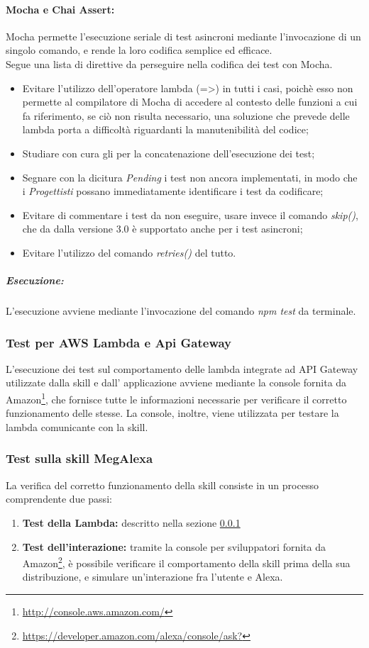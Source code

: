 \paragraph{Mocha e Chai Assert:} Mocha permette l'esecuzione seriale di test asincroni mediante l'invocazione di un singolo comando, e rende la loro codifica semplice ed efficace.\\
Segue una lista di direttive da perseguire nella codifica dei test con Mocha.
\begin{itemize}
	\item Evitare l'utilizzo dell'operatore lambda (=>) in tutti i casi, poichè esso non permette al compilatore di Mocha di accedere al contesto delle funzioni a cui fa riferimento, se ciò non risulta necessario, una soluzione che prevede delle lambda porta a difficoltà riguardanti la manutenibilità del codice;
	\item Studiare con cura gli  per la concatenazione dell'esecuzione dei test;
	\item Segnare con la dicitura \textit{Pending} i test non ancora implementati, in modo che i \textit{Progettisti} possano immediatamente identificare i test da codificare;
	\item Evitare di commentare i test da non eseguire, usare invece il comando \textit{skip()}, che da dalla versione 3.0 è supportato anche per i test asincroni;
	\item Evitare l'utilizzo del comando \textit{retries()} del tutto.
\end{itemize}

\subparagraph{Esecuzione:} L'esecuzione avviene mediante l'invocazione del comando \textit{npm test} da terminale. 

\subsubsection{Test per AWS Lambda e Api Gateway}\label{labmdatest}
L'esecuzione dei test sul comportamento delle lambda integrate ad API Gateway utilizzate dalla skill e dall' applicazione avviene mediante la console fornita da Amazon\footnote{\url{http://console.aws.amazon.com/}}, che fornisce tutte le informazioni necessarie per verificare il corretto funzionamento delle stesse.
La console, inoltre, viene utilizzata per testare la lambda comunicante con la skill.

\subsubsection{Test sulla skill MegAlexa}
La verifica del corretto funzionamento della skill consiste in un processo comprendente due passi:
\begin{enumerate}
	\item 	\textbf{Test della Lambda:} descritto nella sezione \ref{labmdatest}
	\item \textbf{Test dell'interazione:} tramite la console per sviluppatori fornita da Amazon\footnote{\url{https://developer.amazon.com/alexa/console/ask?}}, è possibile verificare il comportamento della skill prima della sua distribuzione, e simulare un'interazione fra l'utente e Alexa.
\end{enumerate}

